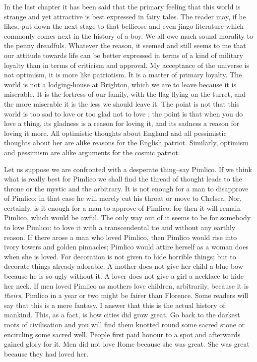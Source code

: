 \documentclass{book}
\begin{document}
In the last chapter it has been said that the primary feeling that this world is strange and yet attractive is best expressed in fairy tales. The reader may, if he likes, put down the next stage to that bellicose and even jingo literature which commonly comes next in the history of a boy. We all owe much sound morality to the penny dreadfuls. Whatever the reason, it seemed and still seems to me that our attitude towards life can be better expressed in terms of a kind of military loyalty than in terms of criticism and approval. My acceptance of the universe is not optimism, it is more like patriotism. It is a matter of primary loyalty. The world is not a lodging-house at Brighton, which we are to leave because it is miserable. It is the fortress of our family, with the flag flying on the turret, and the more miserable it is the less we should leave it. The point is not that this world is too sad to love or too glad not to love ; the point is that when you do love a thing, its gladness is a reason for loving it, and its sadness a reason for loving it more. All optimistic thoughts about England and all pessimistic thoughts about her are alike reasons for the English patriot. Similarly, optimism and pessimism are alike arguments for the cosmic patriot.

Let us suppose we are confronted with a desperate thing–say Pimlico. If we think what is really best for Pimlico we shall find the thread of thought leads to the throne or the mystic and the arbitrary. It is not enough for a man to disapprove of Pimlico: in that case he will merely cut his throat or move to Chelsea. Nor, certainly, is it enough for a man to approve of Pimlico: for then it will remain Pimlico, which would be awful. The only way out of it seems to be for somebody to love Pimlico: to love it with a transcendental tie and without any earthly reason. If there arose a man who loved Pimlico, then Pimlico would rise into ivory towers and golden pinnacles; Pimlico would attire herself as a woman does when she is loved. For decoration is not given to hide horrible things; but to decorate things already adorable. A mother does not give her child a blue bow because he is so ugly without it. A lover does not give a girl a necklace to hide her neck. If men loved Pimlico as mothers love children, arbitrarily, because it is \emph{theirs}, Pimlico in a year or two might be fairer than Florence. Some readers will say that this is a mere fantasy. I answer that this is the actual history of mankind. This, as a fact, is how cities did grow great. Go back to the darkest roots of civilisation and you will find them knotted round some sacred stone or encircling some sacred well. People first paid honour to a spot and afterwards gained glory for it. Men did not love Rome because she was great. She was great because they had loved her.
\end{document}
